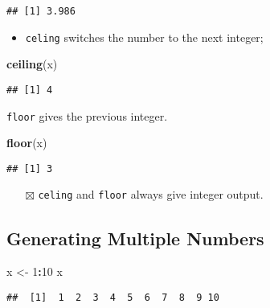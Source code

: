 \documentclass[
]{book}
\newenvironment{Shaded}{\begin{snugshade}}{\end{snugshade}}
\newcommand{\DecValTok}[1]{\textcolor[rgb]{0.00,0.00,0.81}{#1}}
\newcommand{\KeywordTok}[1]{\textcolor[rgb]{0.13,0.29,0.53}{\textbf{#1}}}
\newcommand{\NormalTok}[1]{#1}
\newcommand{\OperatorTok}[1]{\textcolor[rgb]{0.81,0.36,0.00}{\textbf{#1}}}
\newcommand{\StringTok}[1]{\textcolor[rgb]{0.31,0.60,0.02}{#1}}
\providecommand{\tightlist}{%
  \setlength{\itemsep}{0pt}\setlength{\parskip}{0pt}}
\begin{document}
\begin{verbatim}
## [1] 3.986
\end{verbatim}

\begin{itemize}
\tightlist
\item
  \texttt{celing} switches the number to the next integer;
\end{itemize}

\begin{Shaded}
\begin{Highlighting}[]
\KeywordTok{ceiling}\NormalTok{(x)}
\end{Highlighting}
\end{Shaded}

\begin{verbatim}
## [1] 4
\end{verbatim}

\texttt{floor} gives the previous integer.

\begin{Shaded}
\begin{Highlighting}[]
\KeywordTok{floor}\NormalTok{(x)}
\end{Highlighting}
\end{Shaded}

\begin{verbatim}
## [1] 3
\end{verbatim}

\begin{itemize}
\tightlist
\item[$\boxtimes$]
  \texttt{celing} and \texttt{floor} always give integer output.
\end{itemize}

\hypertarget{generating-multiple-numbers}{%
\subsection{Generating Multiple Numbers}\label{generating-multiple-numbers}}

\begin{Shaded}
\begin{Highlighting}[]
\NormalTok{x <-}\StringTok{ }\DecValTok{1}\OperatorTok{:}\DecValTok{10}
\NormalTok{x}
\end{Highlighting}
\end{Shaded}

\begin{verbatim}
##  [1]  1  2  3  4  5  6  7  8  9 10
\end{verbatim}
\end{document}

